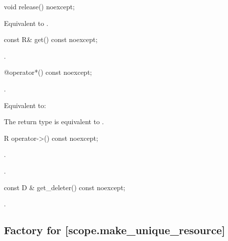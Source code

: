 \documentclass[ebook,11pt,article]{memoir}
\begin{document}
\begin{itemdecl}
void release() noexcept;
\end{itemdecl}

\begin{itemdescr}
\pnum
\effects 
Equivalent to .
\end{itemdescr}


\begin{itemdecl}
const R& get() const noexcept;
\end{itemdecl}

\begin{itemdescr}
\pnum
\returns
{}. %
\end{itemdescr}


\begin{itemdecl}
@\seebelow@ operator*() const noexcept;
\end{itemdecl}

\begin{itemdescr}
\pnum
\constraints 
{}
.

\pnum
\effects 
Equivalent to:\\

\pnum
\remarks
The return type is equivalent to 
. 
\end{itemdescr}

\begin{itemdecl}
R operator->() const noexcept;
\end{itemdecl}

\begin{itemdescr}

\pnum
\constraints 
{} 
. 

\pnum
\returns {}.
\end{itemdescr}

\begin{itemdecl}
const D & get_deleter() const noexcept;
\end{itemdecl}

\begin{itemdescr}
\pnum
\returns {}.
\end{itemdescr}

\subsection {Factory for  [scope.make_unique_resource]}
\end{document}
